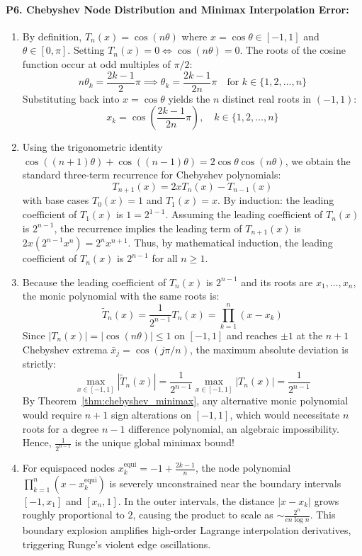 \paragraph{P6. Chebyshev Node Distribution and Minimax Interpolation Error:}
\begin{enumerate}[label=(\alph*)]
    \item By definition, $T_n(x) = \cos(n \theta)$ where $x = \cos \theta \in [-1, 1]$ and $\theta \in [0, \pi]$.
    Setting $T_n(x) = 0 \iff \cos(n \theta) = 0$.
    The roots of the cosine function occur at odd multiples of $\pi/2$:
    \[
    n \theta_k = \frac{2k - 1}{2}\pi \implies \theta_k = \frac{2k - 1}{2n}\pi \quad \text{for } k \in \{1, 2, \dots, n\}
    \]
    Substituting back into $x = \cos \theta$ yields the $n$ distinct real roots in $(-1, 1)$:
    \[
    x_k = \cos\left( \frac{2k - 1}{2n}\pi \right), \quad k \in \{1, 2, \dots, n\}
    \]
    \item Using the trigonometric identity $\cos((n+1)\theta) + \cos((n-1)\theta) = 2\cos \theta \cos(n\theta)$, we obtain the standard three-term recurrence for Chebyshev polynomials:
    \[
    T_{n+1}(x) = 2x T_n(x) - T_{n-1}(x)
    \]
    with base cases $T_0(x) = 1$ and $T_1(x) = x$.
    By induction: the leading coefficient of $T_1(x)$ is $1 = 2^{1-1}$. Assuming the leading coefficient of $T_n(x)$ is $2^{n-1}$, the recurrence implies the leading term of $T_{n+1}(x)$ is $2x(2^{n-1} x^n) = 2^n x^{n+1}$.
    Thus, by mathematical induction, the leading coefficient of $T_n(x)$ is $2^{n-1}$ for all $n \ge 1$.
    \item Because the leading coefficient of $T_n(x)$ is $2^{n-1}$ and its roots are $x_1, \dots, x_n$, the monic polynomial with the same roots is:
    \[
    \tilde{T}_n(x) = \frac{1}{2^{n-1}} T_n(x) = \prod_{k=1}^n (x - x_k)
    \]
    Since $|T_n(x)| = |\cos(n \theta)| \le 1$ on $[-1, 1]$ and reaches $\pm 1$ at the $n+1$ Chebyshev extrema $\bar{x}_j = \cos(j\pi/n)$, the maximum absolute deviation is strictly:
    \[
    \max_{x \in [-1, 1]} |\tilde{T}_n(x)| = \frac{1}{2^{n-1}} \max_{x \in [-1, 1]} |T_n(x)| = \frac{1}{2^{n-1}}
    \]
    By Theorem~\ref{thm:chebyshev_minimax}, any alternative monic polynomial would require $n+1$ sign alterations on $[-1, 1]$, which would necessitate $n$ roots for a degree $n-1$ difference polynomial, an algebraic impossibility. Hence, $\frac{1}{2^{n-1}}$ is the unique global minimax bound!
    \item For equispaced nodes $x_k^{\text{equi}} = -1 + \frac{2k-1}{n}$, the node polynomial $\prod_{k=1}^n (x - x_k^{\text{equi}})$ is severely unconstrained near the boundary intervals $[-1, x_1]$ and $[x_n, 1]$. In the outer intervals, the distance $|x - x_k|$ grows roughly proportional to $2$, causing the product to scale as $\sim \frac{2^n}{e n \log n}$. This boundary explosion amplifies high-order Lagrange interpolation derivatives, triggering Runge's violent edge oscillations.
\end{enumerate}

